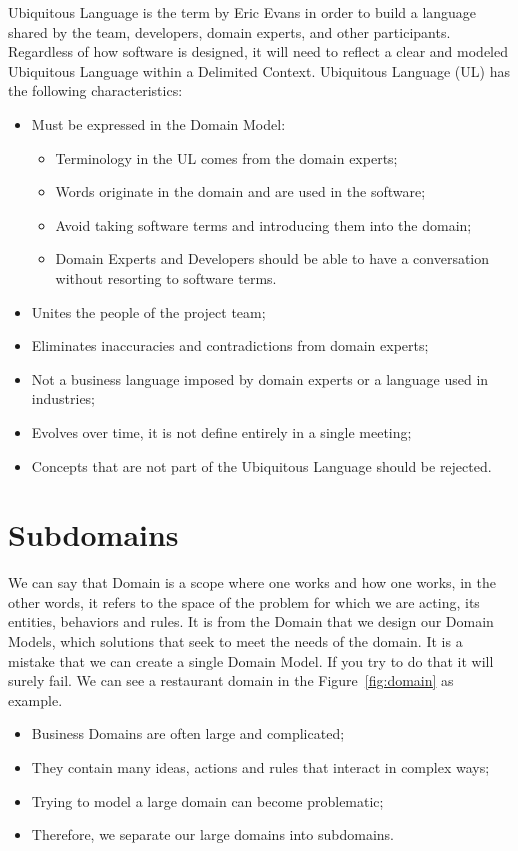 Ubiquitous Language is the term by Eric Evans in order to build a language shared by the team, developers, domain experts, and other participants.
Regardless of how software is designed, it will need to reflect a clear and modeled Ubiquitous Language within a Delimited Context. Ubiquitous Language (UL) has the following characteristics:
\begin{itemize}
    \item Must be expressed in the Domain Model:
    \begin{itemize}
        \item Terminology in the UL comes from the domain experts;
        \item Words originate in the domain and are used in the software;
        \item Avoid taking software terms and introducing them into the domain;
        \item Domain Experts and Developers should be able to have a conversation without resorting to software terms. 
    \end{itemize}
    \item Unites the people of the project team;
    \item Eliminates inaccuracies and contradictions from domain experts;
    \item Not a business language imposed by domain experts or a language used in industries;
    \item Evolves over time, it is not define entirely in a single meeting;
    \item Concepts that are not part of the Ubiquitous Language should be rejected.
\end{itemize}

\section{Subdomains}

We can say that Domain is a scope where one works and how one works, in the other words, it refers to the space of the problem for which we are acting, its entities, behaviors and rules. It is from the Domain that we design our Domain Models, which solutions that seek to meet the needs of the domain. It is a mistake that we can create a single Domain Model. If you try to do that it will surely fail. 
We can see a restaurant domain in the Figure~\ref{fig:domain} as example.

\begin{itemize}
    \item Business Domains are often large and complicated;
    \item They contain many ideas, actions and rules that interact in complex ways;
    \item Trying to model a large domain can become problematic;
    \item Therefore, we separate our large domains into subdomains.
\end{itemize}

